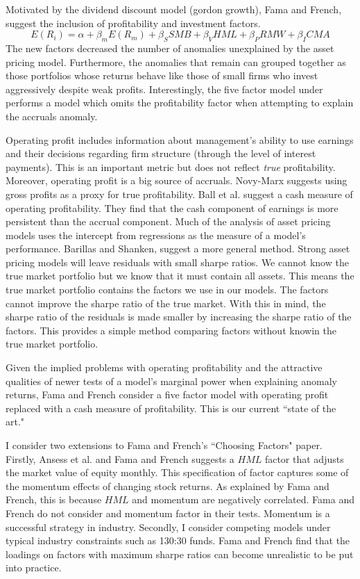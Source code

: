Motivated by the dividend discount model (gordon growth), Fama and 
French\cite{fama2015five}, suggest the inclusion of profitability and 
investment factors.
\begin{equation} \label{eq:FF5F}
  E(R_i)=\alpha+\beta_mE(R_m)+\beta_SSMB+\beta_VHML+\beta_PRMW+\beta_ICMA
\end{equation}
The new factors decreased the number of anomalies unexplained by the asset 
pricing model.
Furthermore, the anomalies that remain can grouped together as those 
portfolios whose returns behave like those of small firms who invest 
aggressively despite weak profits.
Interestingly, the five factor model under performs a model which omits the 
profitability factor when attempting to explain the accruals anomaly.

Operating profit includes information about management's ability to use 
earnings and their decisions regarding firm structure (through the level of 
interest payments).
This is an important metric but does not reflect \emph{true} profitability.
Moreover, operating profit is a big source of accruals. 
Novy-Marx\cite{novy2013other} suggests using gross profits as a proxy for true 
profitability.
Ball et al.\cite{ball2016accruals} suggest a cash measure of operating 
profitability.
They find that the cash component of earnings is more persistent than the 
accrual component.
Much of the analysis of asset pricing models uses the intercept from 
regressions as the measure of a model's performance.
Barillas and Shanken\cite{barillas2016alpha}, suggest a more general method.
Strong asset pricing models will leave residuals with small sharpe ratios.
We cannot know the true market portfolio but we know that it must contain all 
assets.
This means the true market portfolio contains the factors we use in our models.
The factors cannot improve the sharpe ratio of the true market.
With this in mind, the sharpe ratio of the residuals is made smaller by 
increasing the sharpe ratio of the factors. This provides a simple method 
comparing factors without knowin the true market portfolio.

Given the implied problems with operating profitability and the attractive 
qualities of newer tests of a model's marginal power when explaining anomaly 
returns, Fama and French\cite{fama2016dissecting} consider a five factor model 
with operating profit replaced with a cash measure of profitability.
This is our current ``state of the art."

I consider two extensions to Fama and French's ``Choosing Factors" paper.
Firstly, Ansess et al.\cite{asness2013devil} and Fama and 
French\cite{fama2015incremental} suggests a $HML$ factor that adjusts the 
market value of equity monthly. This specification of factor captures some of 
the momentum effects of changing stock returns. As explained by Fama and 
French\cite{fama2015incremental}, this is because $HML$ and momentum are 
negatively correlated. Fama and French\cite{fama2016choosing} do not consider 
and momentum factor in their tests. Momentum is a successful strategy in 
industry.
Secondly, I consider competing models under typical industry constraints such 
as 130:30 funds. Fama and French find that the loadings on factors with 
maximum sharpe ratios can become unrealistic to be put into practice.
